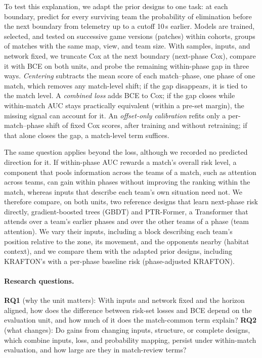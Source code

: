 \documentclass[sigconf,anonymous]{acmart}
\begin{document}
To test this explanation, we adapt the prior designs to one task: at each boundary, predict for every surviving team the probability of elimination before the next boundary from telemetry up to a cutoff 10\,s earlier. Models are trained, selected, and tested on successive game versions (patches) within cohorts, groups of matches with the same map, view, and team size. With samples, inputs, and network fixed, we truncate Cox at the next boundary (next-phase Cox), compare it with BCE on both units, and probe the remaining within-phase gap in three ways. \emph{Centering} subtracts the mean score of each match--phase, one phase of one match, which removes any match-level shift; if the gap disappears, it is tied to the match level. A \emph{combined loss} adds BCE to Cox; if the gap closes while within-match AUC stays practically equivalent (within a pre-set margin), the missing signal can account for it. An \emph{offset-only calibration} refits only a per-match--phase shift of fixed Cox scores, after training and without retraining; if that alone closes the gap, a match-level term suffices.

The same question applies beyond the loss, although we recorded no predicted direction for it. If within-phase AUC rewards a match's overall risk level, a component that pools information across the teams of a match, such as attention across teams, can gain within phases without improving the ranking within the match, whereas inputs that describe each team's own situation need not. We therefore compare, on both units, two reference designs that learn next-phase risk directly, gradient-boosted trees (GBDT) and PTR-Former, a Transformer that attends over a team's earlier phases and over the other teams of a phase (team attention). We vary their inputs, including a block describing each team's position relative to the zone, its movement, and the opponents nearby (habitat context), and we compare them with the adapted prior designs, including KRAFTON's with a per-phase baseline risk (phase-adjusted KRAFTON).

\paragraph{Research questions.}
\textbf{RQ1} (why the unit matters): With inputs and network fixed and the horizon aligned, how does the difference between risk-set losses and BCE depend on the evaluation unit, and how much of it does the match-common term explain?
\textbf{RQ2} (what changes): Do gains from changing inputs, structure, or complete designs, which combine inputs, loss, and probability mapping, persist under within-match evaluation, and how large are they in match-review terms?
\end{document}
